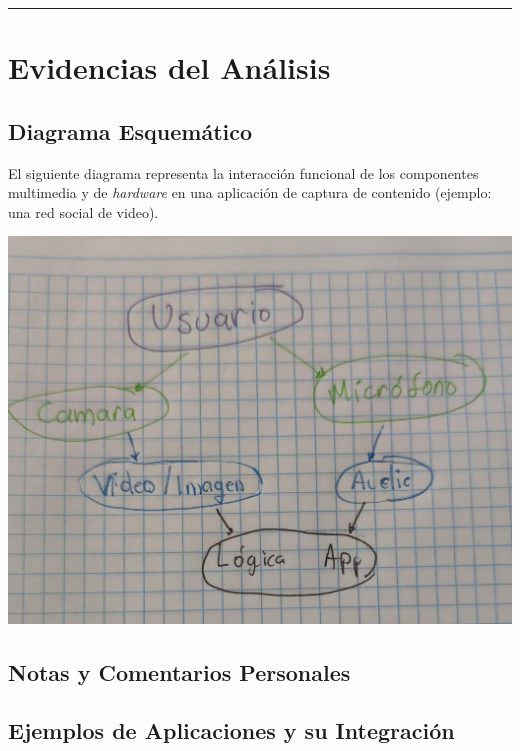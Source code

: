 \documentclass{article}
\begin{document}
\hrule

\section{Evidencias del Análisis}

\subsection{Diagrama Esquemático}

El siguiente diagrama representa la interacción funcional de los componentes multimedia y de \textit{hardware} en una aplicación de captura de contenido (ejemplo: una red social de video).


\begin{center}
    \includegraphics[scale=0.2]{diagrama.jpg}
\end{center}


\subsection{Notas y Comentarios Personales}


\subsection{Ejemplos de Aplicaciones y su Integración}
\end{document}
